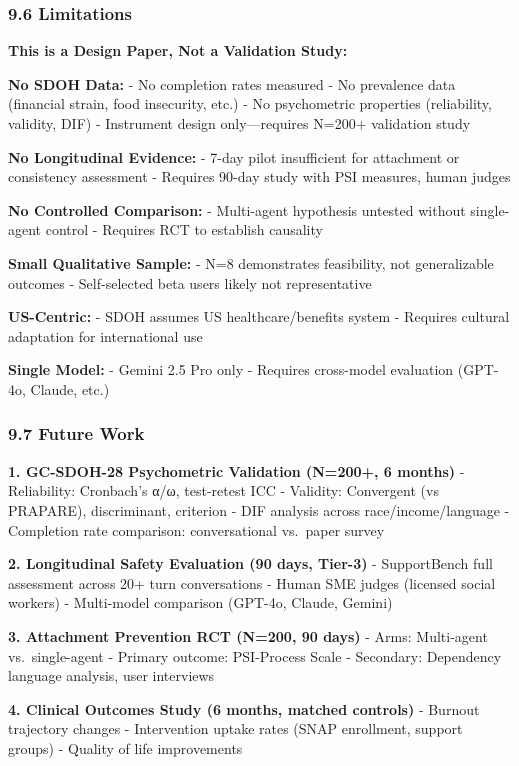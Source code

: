 \documentclass[
]{article}
\begin{document}
\subsubsection{9.6 Limitations}\label{limitations-1}

\textbf{This is a Design Paper, Not a Validation Study:}

\textbf{No SDOH Data:} - No completion rates measured - No prevalence
data (financial strain, food insecurity, etc.) - No psychometric
properties (reliability, validity, DIF) - Instrument design
only---requires N=200+ validation study

\textbf{No Longitudinal Evidence:} - 7-day pilot insufficient for
attachment or consistency assessment - Requires 90-day study with PSI
measures, human judges

\textbf{No Controlled Comparison:} - Multi-agent hypothesis untested
without single-agent control - Requires RCT to establish causality

\textbf{Small Qualitative Sample:} - N=8 demonstrates feasibility, not
generalizable outcomes - Self-selected beta users likely not
representative

\textbf{US-Centric:} - SDOH assumes US healthcare/benefits system -
Requires cultural adaptation for international use

\textbf{Single Model:} - Gemini 2.5 Pro only - Requires cross-model
evaluation (GPT-4o, Claude, etc.)

\subsubsection{9.7 Future Work}\label{future-work}

\textbf{1. GC-SDOH-28 Psychometric Validation (N=200+, 6 months)} -
Reliability: Cronbach's α/ω, test-retest ICC - Validity: Convergent (vs
PRAPARE), discriminant, criterion - DIF analysis across
race/income/language - Completion rate comparison: conversational
vs.~paper survey

\textbf{2. Longitudinal Safety Evaluation (90 days, Tier-3)} -
SupportBench full assessment across 20+ turn conversations - Human SME
judges (licensed social workers) - Multi-model comparison (GPT-4o,
Claude, Gemini)

\textbf{3. Attachment Prevention RCT (N=200, 90 days)} - Arms:
Multi-agent vs.~single-agent - Primary outcome: PSI-Process Scale -
Secondary: Dependency language analysis, user interviews

\textbf{4. Clinical Outcomes Study (6 months, matched controls)} -
Burnout trajectory changes - Intervention uptake rates (SNAP enrollment,
support groups) - Quality of life improvements
\end{document}
